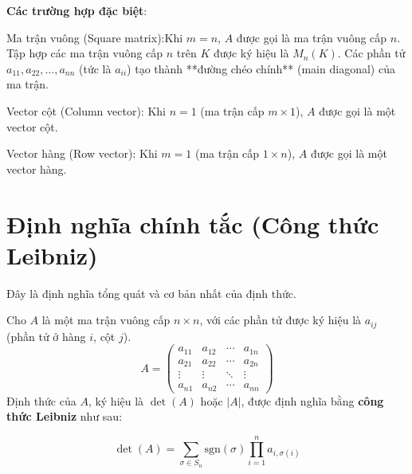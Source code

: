 \textbf{Các trường hợp đặc biệt}:

Ma trận vuông (Square matrix):Khi $m = n$, $A$ được gọi là ma trận vuông cấp $n$. Tập hợp các ma trận vuông cấp $n$ trên $K$ được ký hiệu là $M_n(K)$. Các phần tử $a_{11}, a_{22}, \dots, a_{nn}$ (tức là $a_{ii}$) tạo thành **đường chéo chính** (main diagonal) của ma trận.

Vector cột (Column vector): Khi $n = 1$ (ma trận cấp $m \times 1$), $A$ được gọi là một vector cột.

Vector hàng (Row vector): Khi $m = 1$ (ma trận cấp $1 \times n$), $A$ được gọi là một vector hàng.


\section{Định nghĩa chính tắc (Công thức Leibniz)}

Đây là định nghĩa tổng quát và cơ bản nhất của định thức.

Cho $A$ là một ma trận vuông cấp $n \times n$, với các phần tử được ký hiệu là $a_{ij}$ (phần tử ở hàng $i$, cột $j$).
$$ A = \begin{pmatrix}
a_{11} & a_{12} & \cdots & a_{1n} \\
a_{21} & a_{22} & \cdots & a_{2n} \\
\vdots & \vdots & \ddots & \vdots \\
a_{n1} & a_{n2} & \cdots & a_{nn}
\end{pmatrix} $$
Định thức của $A$, ký hiệu là $\det(A)$ hoặc $|A|$, được định nghĩa bằng \textbf{công thức Leibniz} như sau:

$$ \det(A) = \sum_{\sigma \in S_n} \text{sgn}(\sigma) \prod_{i=1}^{n} a_{i, \sigma(i)} $$

